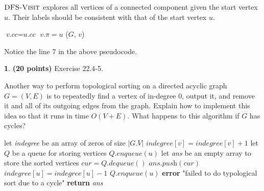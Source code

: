 \documentclass[11pt]{article}
\theoremstyle{definition}
\theoremstyle{theorem}
\newtheorem{prob}{}
\newcommand{\solution}{\medskip\noindent{\color{DarkBlue}\textbf{Solution:}}}
\begin{document}
$\textproc{\textsc{DFS-Visit}}$ explores all vertices of a connected component given the start vertex $u$. Their labels should be consistent with that of the start vertex $u$.
 
\begin{algorithmic}[1]
			\State $\textit{v.cc} = \textit{u.cc}$
			\State $v.\pi = u$
			\State {}($G$, $v$) 
		\EndIf
	\EndFor
\EndFunction
\end{algorithmic}

Notice the line 7 in the above pseudocode.


\newpage
\begin{prob} \textbf{(20 points)} Exercise 22.4-5.
\end{prob}

Another way to perform topological sorting on a directed acyclic graph $G = (V, E)$ is to repeatedly find a vertex of in-degree 0, output it, and remove it and all of its outgoing edges from the graph. Explain how to implement this idea so that it runs in time $O(V + E)$. What happens to this algorithm if $G$ has cycles?

\solution

\begin{algorithmic}[1]
	\State let \textit{indegree} be an array of zeros of size $|G.V|$
	 
			\State $\textit{indegree}[v] = \textit{indegree}[v] + 1$
		\EndFor
	\EndFor
	\State let $Q$ be a queue for storing vertices 
			\State $\textit{Q.enqueue}(u)$
		\EndIf
	\EndFor
	\State let \textit{ans} be an empty array to store the sorted vertices
		\State $\textit{cur} = \textit{Q.dequeue}()$
		\State $\textit{ans.push}(\textit{cur})$
			\State $\textit{indegree}[u] = \textit{indegree}[u] - 1$
				\State $\textit{Q.enqueue}(u)$ 
			\EndIf
		\EndFor
	\EndWhile
			\State \textbf{error} "failed to do typological sort due to a cycle" 
		\EndIf
	\EndFor
	\State \textbf{return} \textit{ans}
\EndFunction
\end{algorithmic}
\end{document}
